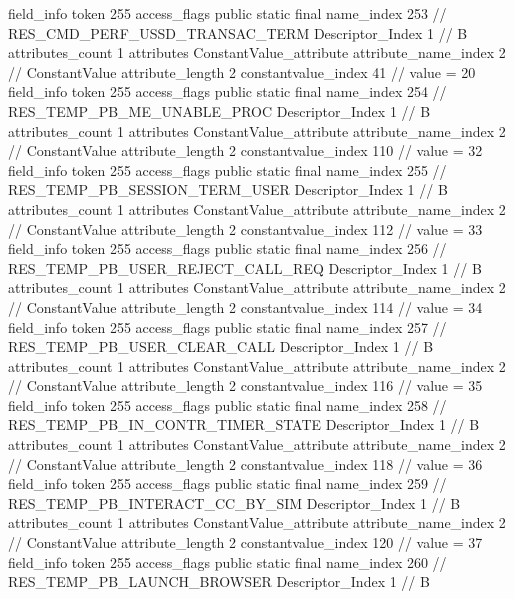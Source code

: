 {{{{{{{				}
				}
			}
			field_info {
				token	255
				access_flags	public static final
				name_index	253		// RES_CMD_PERF_USSD_TRANSAC_TERM
				Descriptor_Index	1		// B
				attributes_count	1
				attributes {
				ConstantValue_attribute {
					attribute_name_index	2		// ConstantValue
					attribute_length	2
					constantvalue_index	41		// value = 20
				}
				}
			}
			field_info {
				token	255
				access_flags	public static final
				name_index	254		// RES_TEMP_PB_ME_UNABLE_PROC
				Descriptor_Index	1		// B
				attributes_count	1
				attributes {
				ConstantValue_attribute {
					attribute_name_index	2		// ConstantValue
					attribute_length	2
					constantvalue_index	110		// value = 32
				}
				}
			}
			field_info {
				token	255
				access_flags	public static final
				name_index	255		// RES_TEMP_PB_SESSION_TERM_USER
				Descriptor_Index	1		// B
				attributes_count	1
				attributes {
				ConstantValue_attribute {
					attribute_name_index	2		// ConstantValue
					attribute_length	2
					constantvalue_index	112		// value = 33
				}
				}
			}
			field_info {
				token	255
				access_flags	public static final
				name_index	256		// RES_TEMP_PB_USER_REJECT_CALL_REQ
				Descriptor_Index	1		// B
				attributes_count	1
				attributes {
				ConstantValue_attribute {
					attribute_name_index	2		// ConstantValue
					attribute_length	2
					constantvalue_index	114		// value = 34
				}
				}
			}
			field_info {
				token	255
				access_flags	public static final
				name_index	257		// RES_TEMP_PB_USER_CLEAR_CALL
				Descriptor_Index	1		// B
				attributes_count	1
				attributes {
				ConstantValue_attribute {
					attribute_name_index	2		// ConstantValue
					attribute_length	2
					constantvalue_index	116		// value = 35
				}
				}
			}
			field_info {
				token	255
				access_flags	public static final
				name_index	258		// RES_TEMP_PB_IN_CONTR_TIMER_STATE
				Descriptor_Index	1		// B
				attributes_count	1
				attributes {
				ConstantValue_attribute {
					attribute_name_index	2		// ConstantValue
					attribute_length	2
					constantvalue_index	118		// value = 36
				}
				}
			}
			field_info {
				token	255
				access_flags	public static final
				name_index	259		// RES_TEMP_PB_INTERACT_CC_BY_SIM
				Descriptor_Index	1		// B
				attributes_count	1
				attributes {
				ConstantValue_attribute {
					attribute_name_index	2		// ConstantValue
					attribute_length	2
					constantvalue_index	120		// value = 37
				}
				}
			}
			field_info {
				token	255
				access_flags	public static final
				name_index	260		// RES_TEMP_PB_LAUNCH_BROWSER
				Descriptor_Index	1		// B
}}}}}
